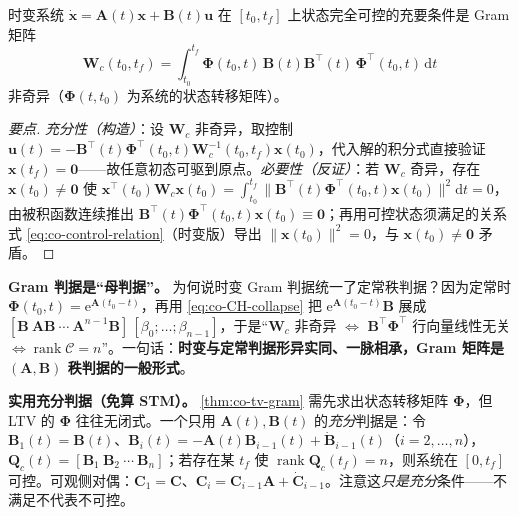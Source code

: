 \begin{theorem}\label{thm:co-tv-gram}
时变系统 $\dot{\mathbf{x}}=\mathbf{A}(t)\mathbf{x}+\mathbf{B}(t)\mathbf{u}$ 在 $[t_0,t_f]$ 上状态完全可控的充要条件是 Gram 矩阵
\begin{equation}
  \mathbf{W}_c(t_0,t_f)=\int_{t_0}^{t_f}\boldsymbol{\Phi}(t_0,t)\,\mathbf{B}(t)\mathbf{B}^\top(t)\,\boldsymbol{\Phi}^\top(t_0,t)\,\mathrm dt
  \label{eq:co-tv-gramc}
\end{equation}
非奇异（$\boldsymbol{\Phi}(t,t_0)$ 为系统的状态转移矩阵）\cite{liubao2006modern}。
\end{theorem}

\begin{proof}[要点]
\emph{充分性（构造）}：设 $\mathbf{W}_c$ 非奇异，取控制 $\mathbf{u}(t)=-\mathbf{B}^\top(t)\boldsymbol{\Phi}^\top(t_0,t)\mathbf{W}_c^{-1}(t_0,t_f)\mathbf{x}(t_0)$，代入解的积分式直接验证 $\mathbf{x}(t_f)=\mathbf{0}$——故任意初态可驱到原点。\emph{必要性（反证）}：若 $\mathbf{W}_c$ 奇异，存在 $\mathbf{x}(t_0)\neq\mathbf{0}$ 使 $\mathbf{x}^\top(t_0)\mathbf{W}_c\mathbf{x}(t_0)=\int_{t_0}^{t_f}\|\mathbf{B}^\top(t)\boldsymbol{\Phi}^\top(t_0,t)\mathbf{x}(t_0)\|^2\mathrm dt=0$，由被积函数连续推出 $\mathbf{B}^\top(t)\boldsymbol{\Phi}^\top(t_0,t)\mathbf{x}(t_0)\equiv\mathbf{0}$；再用可控状态须满足的关系式 \cref{eq:co-control-relation}（时变版）导出 $\|\mathbf{x}(t_0)\|^2=0$，与 $\mathbf{x}(t_0)\neq\mathbf{0}$ 矛盾\cite{liubao2006modern}。
\end{proof}

\begin{insight}
\textbf{Gram 判据是“母判据”。}\;
为何说时变 Gram 判据统一了定常秩判据？因为定常时 $\boldsymbol{\Phi}(t_0,t)=\mathrm{e}^{\mathbf{A}(t_0-t)}$，再用 \cref{eq:co-CH-collapse} 把 $\mathrm{e}^{\mathbf{A}(t_0-t)}\mathbf{B}$ 展成 $[\mathbf{B}\ \mathbf{A}\mathbf{B}\ \cdots\ \mathbf{A}^{n-1}\mathbf{B}]\,[\beta_0;\dots;\beta_{n-1}]$，于是“$\mathbf{W}_c$ 非奇异 $\iff$ $\mathbf{B}^\top\boldsymbol{\Phi}^\top$ 行向量线性无关 $\iff\operatorname{rank}\mathcal{C}=n$”\cite{liubao2006modern}。一句话：\textbf{时变与定常判据形异实同、一脉相承，Gram 矩阵是 $(\mathbf{A},\mathbf{B})$ 秩判据的一般形式}。
\end{insight}

\begin{note}
\textbf{实用充分判据（免算 STM）。}\;
\cref{thm:co-tv-gram} 需先求出状态转移矩阵 $\boldsymbol{\Phi}$，但 LTV 的 $\boldsymbol{\Phi}$ 往往无闭式。一个只用 $\mathbf{A}(t),\mathbf{B}(t)$ 的\emph{充分}判据是：令 $\mathbf{B}_1(t)=\mathbf{B}(t)$、$\mathbf{B}_i(t)=-\mathbf{A}(t)\mathbf{B}_{i-1}(t)+\dot{\mathbf{B}}_{i-1}(t)$（$i=2,\dots,n$），$\mathbf{Q}_c(t)=[\mathbf{B}_1\ \mathbf{B}_2\ \cdots\ \mathbf{B}_n]$；若存在某 $t_f$ 使 $\operatorname{rank}\mathbf{Q}_c(t_f)=n$，则系统在 $[0,t_f]$ 可控\cite{liubao2006modern}。可观侧对偶：$\mathbf{C}_1=\mathbf{C}$、$\mathbf{C}_i=\mathbf{C}_{i-1}\mathbf{A}+\dot{\mathbf{C}}_{i-1}$。注意这\emph{只是充分}条件——不满足不代表不可控。
\end{note}

